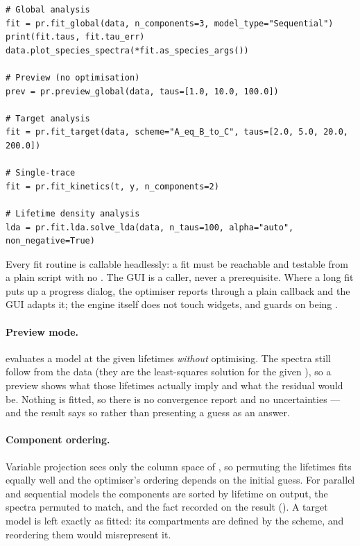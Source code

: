 \begin{lstlisting}
# Global analysis
fit = pr.fit_global(data, n_components=3, model_type="Sequential")
print(fit.taus, fit.tau_err)
data.plot_species_spectra(*fit.as_species_args())

# Preview (no optimisation)
prev = pr.preview_global(data, taus=[1.0, 10.0, 100.0])

# Target analysis
fit = pr.fit_target(data, scheme="A_eq_B_to_C", taus=[2.0, 5.0, 20.0, 200.0])

# Single-trace
fit = pr.fit_kinetics(t, y, n_components=2)

# Lifetime density analysis
lda = pr.fit.lda.solve_lda(data, n_taus=100, alpha="auto", non_negative=True)
\end{lstlisting}

Every fit routine is callable headlessly: a fit must be reachable and testable
from a plain script with no . The GUI is a caller, never a
prerequisite. Where a long fit puts up a progress dialog, the optimiser reports
through a plain callback and the GUI adapts it; the engine itself does not
touch widgets, and guards on  being .

\paragraph{Preview mode.}  evaluates a model at
the given lifetimes \emph{without} optimising. The spectra still follow from
the data (they are the least-squares solution for the given \Cmat), so a
preview shows what those lifetimes actually imply and what the residual would
be. Nothing is fitted, so there is no convergence report and no uncertainties
--- and the result says so rather than presenting a guess as an answer.

\paragraph{Component ordering.} Variable projection sees only the column
space of \Cmat, so permuting the lifetimes fits equally well and the
optimiser's ordering depends on the initial guess. For parallel and sequential
models the components are sorted by lifetime on output, the spectra permuted to
match, and the fact recorded on the result (). A
target model is left exactly as fitted: its compartments are defined by the
scheme, and reordering them would misrepresent it.

